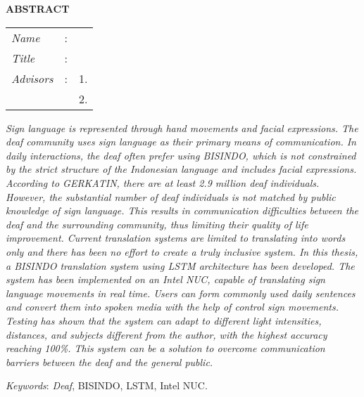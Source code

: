 \begin{center}
  \large\textbf{ABSTRACT}
\end{center}


\vspace{2ex}

\begingroup
\setlength{\tabcolsep}{0pt}

\noindent
\begin{tabularx}{\textwidth}{l >{\centering}m{3em} X}
  \emph{Name}     & : & \name{}         \\

  \emph{Title}    & : & \engtatitle{}   \\

  \emph{Advisors} & : & 1. \advisor{}   \\
                  &   & 2. \coadvisor{} \\
\end{tabularx}
\endgroup

\emph{
  Sign language is represented through hand movements and facial expressions. The deaf community uses sign language as their primary means of communication. In daily interactions, the deaf often prefer using BISINDO, which is not constrained by the strict structure of the Indonesian language and includes facial expressions. According to GERKATIN, there are at least 2.9 million deaf individuals. However, the substantial number of deaf individuals is not matched by public knowledge of sign language. This results in communication difficulties between the deaf and the surrounding community, thus limiting their quality of life improvement. Current translation systems are limited to translating into words only and there has been no effort to create a truly inclusive system. In this thesis, a BISINDO translation system using LSTM architecture has been developed. The system has been implemented on an Intel NUC, capable of translating sign language movements in real time. Users can form commonly used daily sentences and convert them into spoken media with the help of control sign movements. Testing has shown that the system can adapt to different light intensities, distances, and subjects different from the author, with the highest accuracy reaching 100\%. This system can be a solution to overcome communication barriers between the deaf and the general public.}

\emph{Keywords}: \emph{Deaf}, BISINDO, LSTM, Intel NUC.
